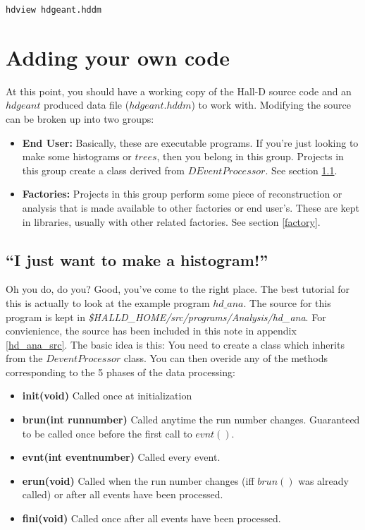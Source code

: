\documentclass[12pt]{article}
\begin{document}
\begin{lstlisting}[frame=shadowbox,backgroundcolor=\color{cmdbkgd}]
hdview hdgeant.hddm
\end{lstlisting}


\section{Adding your own code}
At this point, you should have a working copy of the Hall-D source 
code and an $hdgeant$ produced data file ($hdgeant.hddm$) to work with.
Modifying the source can be broken up into two groups:
\begin{itemize}
	\item{\bf End User:} Basically, these are executable programs. If
	you're just looking to make some histograms or $trees$, then
	you belong in this group. Projects in this group create a class
	derived from $DEventProcessor$. See section \ref{enduser}.
	
	\item{\bf Factories:} Projects in this group perform some piece
	of reconstruction or analysis that is made available to other
	factories or end user's. These are kept in libraries, usually with
	other related factories. See section \ref{factory}.
\end{itemize}

\subsection{``I just want to make a histogram!''}
\label{enduser}
Oh you do, do you? Good, you've come to the right place. The best
tutorial for this is actually to look at the example program $hd\_ana$. The
source for this program is kept in
{\it \$HALLD\_HOME/src/programs/Analysis/hd\_ana}. For convienience, the
source has been included in this note in appendix \ref{hd_ana_src}.
The basic idea is
this: You need to create a class which inherits from the $DeventProcessor$
class. You can then overide any of the methods corresponding to the 5 phases
of the data processing:

\begin{itemize}
	\item{\bf init(void)} Called once at initialization
	\item{\bf brun(int runnumber)} Called anytime the run number changes.
	 Guaranteed to be called once before the first call to $evnt()$.
	\item{\bf evnt(int eventnumber)} Called every event.
	\item{\bf erun(void)} Called when the run number changes (iff $brun()$
	 was already called) or after all events have been processed.
	\item{\bf fini(void)} Called once after all events have been processed.
\end{itemize}
\end{document}

